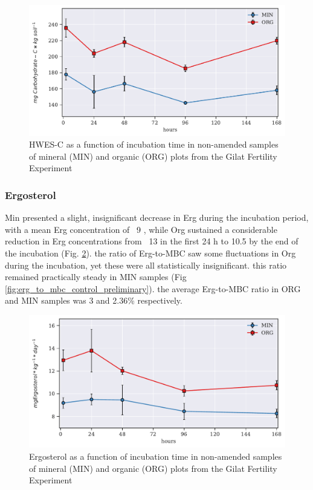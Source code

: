             \begin{figure}[H]
                \centering
                \includegraphics[scale=0.8]{thesis_figures/preliminary/control//HWES-C.pdf}
                \caption{HWES-C  as a function of incubation time in non-amended samples  of mineral (MIN) and organic (ORG) plots from the Gilat Fertility Experiment}
                \label{fig:hwes-c_control_preliminary}
            \end{figure}

        \subsubsection{Ergosterol}
            Min presented a slight, insignificant decrease in Erg during the incubation period, with a mean Erg concentration of ~9 \genericunit, while Org sustained a considerable reduction in Erg concentrations from ~13 \genericunit in the first 24 h to 10.5 \genericunit by the end of the incubation (Fig. \ref{fig:erg_control_preliminary}). the ratio of Erg-to-MBC saw some fluctuations in Org during the incubation, yet these were all statistically insignificant. this ratio remained practically steady in MIN samples (Fig \ref{fig:erg_to_mbc_control_preliminary}). the average Erg-to-MBC ratio in ORG and MIN samples was 3 and 2.36\% respectively.

            \begin{figure}[H]
                \centering
                \includegraphics[scale=0.8]{thesis_figures/preliminary/control/Erg.pdf}
                \caption{Ergosterol  as a function of incubation time in non-amended samples  of mineral (MIN) and organic (ORG) plots from the Gilat Fertility Experiment}
                \label{fig:erg_control_preliminary}
            \end{figure}

